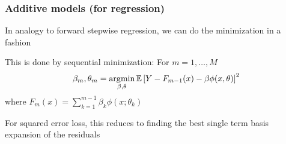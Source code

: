 \documentclass[12pt]{beamer}
\begin{document}
\begin{frame}[fragile]
\frametitle{Additive models (for regression)}
In analogy to forward stepwise regression, we can do the minimization in a  fashion 


\vsp
This is done by sequential minimization: For $m =1 ,\ldots,M$
\[
\beta_m,\theta_m = \operatorname*{\arg\!\min}_{\beta,\theta} \mathbb{E}\left[ Y - F_{m-1}(x) - \beta\phi(x,\theta)\right]^2
\]
where $F_{m}(x) = \sum_{k=1}^{m-1} \beta_k \phi(x;\theta_k)$

\vsp
For squared error loss, this reduces to finding the best single term basis expansion of the residuals


\end{frame}
\end{document}
